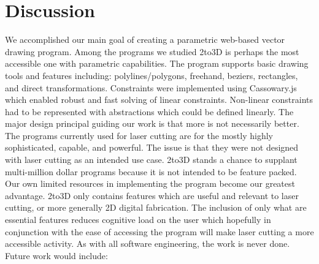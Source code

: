 \section{Discussion}


We accomplished our main goal of creating a parametric web-based vector drawing program. Among the programs we studied 2to3D is perhaps the most accessible one with parametric capabilities. The program supports basic drawing tools and features including: polylines/polygons, freehand, beziers, rectangles, and direct transformations. Constraints were implemented using Cassowary.js which enabled robust and fast solving of linear constraints. Non-linear constraints had to be represented with abstractions which could be defined linearly. The major design principal guiding our work is that more is not necessarily better. The programs currently used for laser cutting are for the mostly highly sophisticated, capable, and powerful. The issue is that they were not designed with laser cutting as an intended use case. 2to3D stands a chance to supplant multi-million dollar programs because it is not intended to be feature packed. Our own limited resources in implementing the program become our greatest advantage. 2to3D only contains features which are useful and relevant to laser cutting, or more generally 2D digital fabrication. The inclusion of only what are essential features reduces cognitive load on the user which hopefully in conjunction with the ease of accessing the program will make laser cutting a more accessible activity. As with all software engineering, the work is never done. Future work would include:

